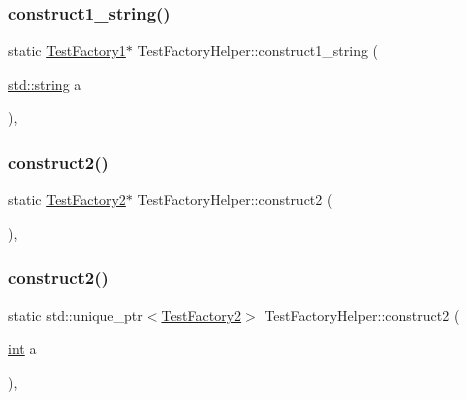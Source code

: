 \subsubsection{\texorpdfstring{construct1\_string()}{construct1\_string()}}
{\footnotesize\ttfamily static \mbox{\hyperlink{class_test_factory1}{Test\+Factory1}}$\ast$ Test\+Factory\+Helper\+::construct1\+\_\+string (\begin{DoxyParamCaption}\item[{\mbox{\hyperlink{_s_d_l__opengl__glext_8h_ab4ccfaa8ab0e1afaae94dc96ef52dde1}{std\+::string}}}]{a }\end{DoxyParamCaption})\hspace{0.3cm}{\ttfamily [inline]}, {\ttfamily [static]}}

\mbox{\label{class_test_factory_helper_a1cf2d51610df49466239de9a5bff13d2}} 
\subsubsection{\texorpdfstring{construct2()}{construct2()}\hspace{0.1cm}{\footnotesize\ttfamily [1/3]}}
{\footnotesize\ttfamily static \mbox{\hyperlink{class_test_factory2}{Test\+Factory2}}$\ast$ Test\+Factory\+Helper\+::construct2 (\begin{DoxyParamCaption}{ }\end{DoxyParamCaption})\hspace{0.3cm}{\ttfamily [inline]}, {\ttfamily [static]}}

\mbox{\label{class_test_factory_helper_a884d0975ae3186e48ab24be4e55fd775}} 
\subsubsection{\texorpdfstring{construct2()}{construct2()}\hspace{0.1cm}{\footnotesize\ttfamily [2/3]}}
{\footnotesize\ttfamily static std\+::unique\+\_\+ptr$<$\mbox{\hyperlink{class_test_factory2}{Test\+Factory2}}$>$ Test\+Factory\+Helper\+::construct2 (\begin{DoxyParamCaption}\item[{\mbox{\hyperlink{warnings_8h_a74f207b5aa4ba51c3a2ad59b219a423b}{int}}}]{a }\end{DoxyParamCaption})\hspace{0.3cm}{\ttfamily [inline]}, {\ttfamily [static]}}

